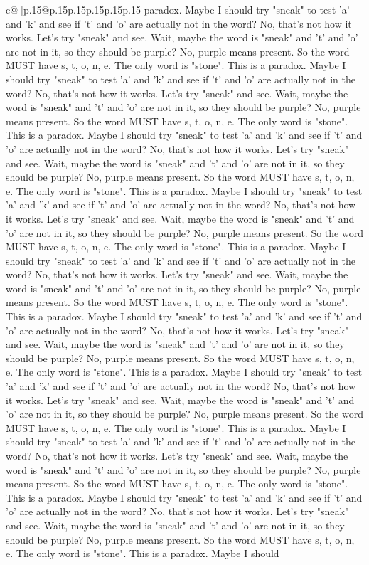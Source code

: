 \documentclass{article}
\begin{document}
{\begin{supertabular}{c@{$\;$}|p{.15\linewidth}@{}p{.15\linewidth}p{.15\linewidth}p{.15\linewidth}p{.15\linewidth}p{.15\linewidth}}
{{{paradox. Maybe I should try "sneak" to test 'a' and 'k' and see if 't' and 'o' are actually not in the word? No, that's not how it works. Let's try "sneak" and see. Wait, maybe the word is "sneak" and 't' and 'o' are not in it, so they should be purple? No, purple means present. So the word MUST have s, t, o, n, e. The only word is "stone". This is a paradox. Maybe I should try "sneak" to test 'a' and 'k' and see if 't' and 'o' are actually not in the word? No, that's not how it works. Let's try "sneak" and see. Wait, maybe the word is "sneak" and 't' and 'o' are not in it, so they should be purple? No, purple means present. So the word MUST have s, t, o, n, e. The only word is "stone". This is a paradox. Maybe I should try "sneak" to test 'a' and 'k' and see if 't' and 'o' are actually not in the word? No, that's not how it works. Let's try "sneak" and see. Wait, maybe the word is "sneak" and 't' and 'o' are not in it, so they should be purple? No, purple means present. So the word MUST have s, t, o, n, e. The only word is "stone". This is a paradox. Maybe I should try "sneak" to test 'a' and 'k' and see if 't' and 'o' are actually not in the word? No, that's not how it works. Let's try "sneak" and see. Wait, maybe the word is "sneak" and 't' and 'o' are not in it, so they should be purple? No, purple means present. So the word MUST have s, t, o, n, e. The only word is "stone". This is a paradox. Maybe I should try "sneak" to test 'a' and 'k' and see if 't' and 'o' are actually not in the word? No, that's not how it works. Let's try "sneak" and see. Wait, maybe the word is "sneak" and 't' and 'o' are not in it, so they should be purple? No, purple means present. So the word MUST have s, t, o, n, e. The only word is "stone". This is a paradox. Maybe I should try "sneak" to test 'a' and 'k' and see if 't' and 'o' are actually not in the word? No, that's not how it works. Let's try "sneak" and see. Wait, maybe the word is "sneak" and 't' and 'o' are not in it, so they should be purple? No, purple means present. So the word MUST have s, t, o, n, e. The only word is "stone". This is a paradox. Maybe I should try "sneak" to test 'a' and 'k' and see if 't' and 'o' are actually not in the word? No, that's not how it works. Let's try "sneak" and see. Wait, maybe the word is "sneak" and 't' and 'o' are not in it, so they should be purple? No, purple means present. So the word MUST have s, t, o, n, e. The only word is "stone". This is a paradox. Maybe I should try "sneak" to test 'a' and 'k' and see if 't' and 'o' are actually not in the word? No, that's not how it works. Let's try "sneak" and see. Wait, maybe the word is "sneak" and 't' and 'o' are not in it, so they should be purple? No, purple means present. So the word MUST have s, t, o, n, e. The only word is "stone". This is a paradox. Maybe I should try "sneak" to test 'a' and 'k' and see if 't' and 'o' are actually not in the word? No, that's not how it works. Let's try "sneak" and see. Wait, maybe the word is "sneak" and 't' and 'o' are not in it, so they should be purple? No, purple means present. So the word MUST have s, t, o, n, e. The only word is "stone". This is a paradox. Maybe I should }}}
\end{supertabular}}
\end{document}
